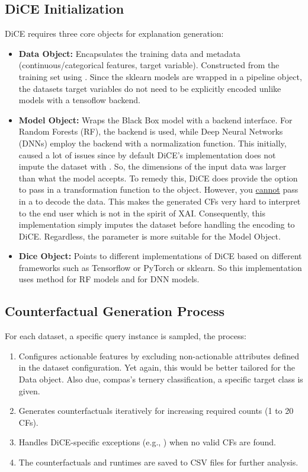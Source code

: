 \subsection{DiCE Initialization}
DiCE requires three core objects for explanation generation:
\begin{itemize}
    \item \textbf{Data Object:} Encapsulates the training data and metadata (continuous/categorical features, target variable). Constructed from the training set using . Since the sklearn models are wrapped in a pipeline object, the datasets target variables do not need to be explicitly encoded unlike models with a tensoflow backend. 
    \item \textbf{Model Object:} Wraps the Black Box model with a backend interface. For Random Forests (RF), the  backend is used, while Deep Neural Networks (DNNs) employ the  backend with a  normalization function. This initially, caused a lot of issues since by default DiCE's implementation does not impute the dataset with . So, the dimensions of the input data was larger than what the model accepts. To remedy this, DiCE does provide the option to pass in a transformation function to the  object. However, you \href{https://github.com/interpretml/DiCE/blob/f93a2d35937f451d8340363895699859d862a6da/dice_ml/utils/helpers.py#L329}{cannot} pass in a  to decode the data. This makes the generated CFs very hard to interpret to the end user which is not in the spirit of XAI. Consequently, this implementation simply imputes the dataset before handling the encoding to DiCE. Regardless, the  parameter is more suitable for the Model Object. 
    \item \textbf{Dice Object:} Points to different implementations of DiCE based on different frameworks such as Tensorflow or PyTorch or sklearn. So this implementation uses  method for RF models and  for DNN models.
\end{itemize}

\subsection{Counterfactual Generation Process}
For each dataset, a specific query instance is sampled, the process:
\begin{enumerate}
\item Configures actionable features by excluding non-actionable attributes defined in the dataset configuration. Yet again, this would be better tailored for the Data object. Also due, compas's ternery classification, a specific target class is given.
\item Generates counterfactuals iteratively for increasing required counts (1 to 20 CFs).
\item Handles DiCE-specific exceptions (e.g., ) when no valid CFs are found.
\item The counterfactuals and runtimes are saved to CSV files for further analysis.
\end{enumerate}

